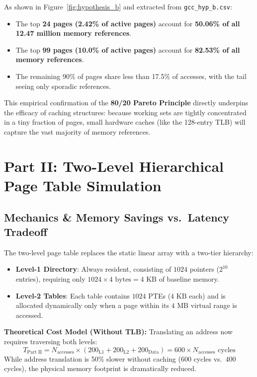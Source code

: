\documentclass[11pt,a4paper]{article}
\begin{document}
As shown in Figure~\ref{fig:hypothesis_b} and extracted from \texttt{gcc\_hyp\_b.csv}:
\begin{itemize}
    \item The top \textbf{24 pages (2.42\% of active pages)} account for \textbf{50.06\% of all 12.47 million memory references}.
    \item The top \textbf{99 pages (10.0\% of active pages)} account for \textbf{82.53\% of all memory references}.
    \item The remaining 90\% of pages share less than 17.5\% of accesses, with the tail seeing only sporadic references.
\end{itemize}
This empirical confirmation of the \textbf{80/20 Pareto Principle} directly underpins the efficacy of caching structures: because working sets are tightly concentrated in a tiny fraction of pages, small hardware caches (like the 128-entry TLB) will capture the vast majority of memory references.

\section{Part II: Two-Level Hierarchical Page Table Simulation}

\subsection{Mechanics \& Memory Savings vs.\ Latency Tradeoff}
The two-level page table replaces the static linear array with a two-tier hierarchy:
\begin{itemize}
    \item \textbf{Level-1 Directory}: Always resident, consisting of $1024$ pointers ($2^{10}$ entries), requiring only $1024 \times 4\text{ bytes} = 4\text{ KB}$ of baseline memory.
    \item \textbf{Level-2 Tables}: Each table contains $1024$ PTEs ($4\text{ KB}$ each) and is allocated dynamically only when a page within its $4\text{ MB}$ virtual range is accessed.
\end{itemize}

\noindent\textbf{Theoretical Cost Model (Without TLB):}
Translating an address now requires traversing both levels:
\begin{equation}
    T_{\text{Part II}} = N_{\text{accesses}} \times (200_{\text{L1}} + 200_{\text{L2}} + 200_{\text{Data}}) = 600 \times N_{\text{accesses}} \text{ cycles}
\end{equation}
While address translation is 50\% slower without caching (600 cycles vs.\ 400 cycles), the physical memory footprint is dramatically reduced.
\end{document}
